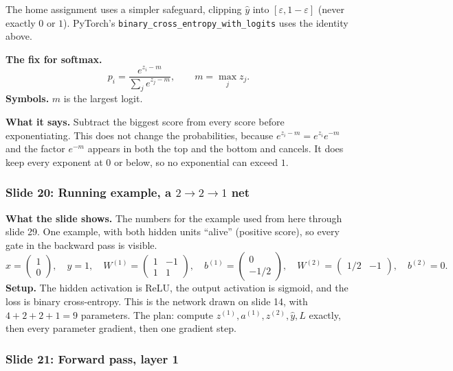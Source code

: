 The home assignment uses a simpler safeguard, clipping $\hat{y}$ into $[\varepsilon,1-\varepsilon]$ (never exactly $0$ or $1$). PyTorch's \texttt{binary\_cross\_entropy\_with\_logits} uses the identity above.

\textbf{The fix for softmax.}
\[
p_i = \frac{e^{z_i-m}}{\sum_j e^{z_j-m}}, \qquad m=\max_j z_j.
\]
\textbf{Symbols.} $m$ is the largest logit.

\textbf{What it says.} Subtract the biggest score from every score before exponentiating. This does not change the probabilities, because $e^{z_i-m}=e^{z_i}e^{-m}$ and the factor $e^{-m}$ appears in both the top and the bottom and cancels. It does keep every exponent at $0$ or below, so no exponential can exceed $1$.

\subsubsection{Slide 20: Running example, a $2\to2\to1$ net}

\textbf{What the slide shows.} The numbers for the example used from here through slide 29. One example, with both hidden units ``alive'' (positive score), so every gate in the backward pass is visible.
\[
x=\begin{pmatrix}1\\0\end{pmatrix},\quad y=1,\quad
W^{(1)}=\begin{pmatrix}1&-1\\1&1\end{pmatrix},\quad
b^{(1)}=\begin{pmatrix}0\\-1/2\end{pmatrix},\quad
W^{(2)}=\begin{pmatrix}1/2&-1\end{pmatrix},\quad b^{(2)}=0 .
\]
\textbf{Setup.} The hidden activation is ReLU, the output activation is sigmoid, and the loss is binary cross-entropy. This is the network drawn on slide 14, with $4+2+2+1=9$ parameters. The plan: compute $z^{(1)},a^{(1)},z^{(2)},\hat{y},L$ exactly, then every parameter gradient, then one gradient step.

\subsubsection{Slide 21: Forward pass, layer 1}

